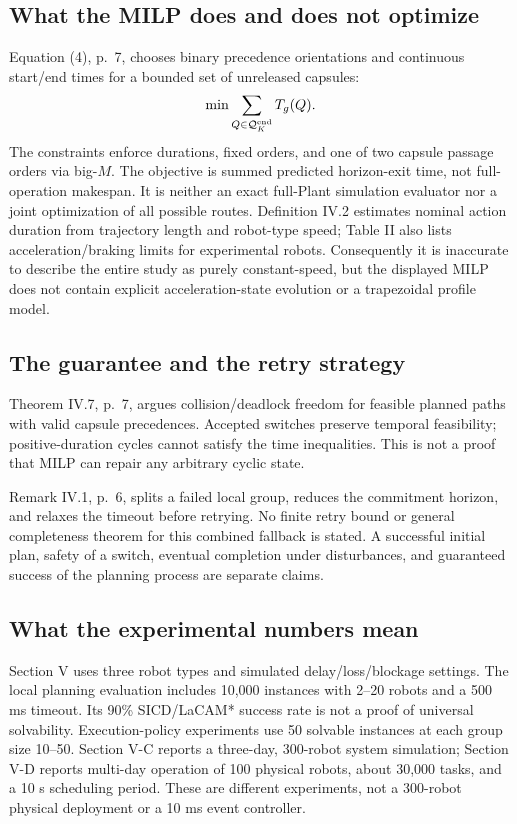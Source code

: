 \documentclass[11pt,a4paper]{article}
\begin{document}
\subsection{What the MILP does and does not optimize}
Equation (4), p.~7, chooses binary precedence orientations and continuous start/end
times for a bounded set of unreleased capsules:
\[
 \min \sum_{Q\in\mathcal Q_K^{\rm end}} T_g(Q).
\]
The constraints enforce durations, fixed orders, and one of two capsule passage
orders via big-$M$. The objective is summed predicted horizon-exit time, not
full-operation makespan. It is neither an exact full-Plant simulation evaluator
nor a joint optimization of all possible routes. Definition IV.2 estimates nominal
action duration from trajectory length and robot-type speed; Table II also lists
acceleration/braking limits for experimental robots. Consequently it is inaccurate
to describe the entire study as purely constant-speed, but the displayed MILP does
not contain explicit acceleration-state evolution or a trapezoidal profile model.

\subsection{The guarantee and the retry strategy}
Theorem IV.7, p.~7, argues collision/deadlock freedom for feasible planned paths
with valid capsule precedences. Accepted switches preserve temporal feasibility;
positive-duration cycles cannot satisfy the time inequalities. This is not a
proof that MILP can repair any arbitrary cyclic state.

Remark IV.1, p.~6, splits a failed local group, reduces the commitment horizon,
and relaxes the timeout before retrying. No finite retry bound or general
completeness theorem for this combined fallback is stated. A successful initial
plan, safety of a switch, eventual completion under disturbances, and guaranteed
success of the planning process are separate claims.

\subsection{What the experimental numbers mean}
Section V uses three robot types and simulated delay/loss/blockage settings.
The local planning evaluation includes 10,000 instances with 2--20 robots and
a 500 ms timeout. Its 90\% SICD/LaCAM* success rate is not a proof of universal
solvability. Execution-policy experiments use 50 solvable instances at each
group size 10--50. Section V-C reports a three-day, 300-robot system simulation;
Section V-D reports multi-day operation of 100 physical robots, about 30,000
tasks, and a 10 s scheduling period. These are different experiments, not a
300-robot physical deployment or a 10 ms event controller.
\end{document}
